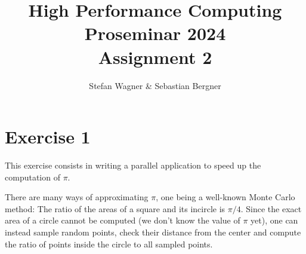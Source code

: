 \documentclass[UTF-8]{article}
\title{High Performance Computing Proseminar 2024 \\
    \large Assignment 2} %
\author{Stefan Wagner \& Sebastian Bergner}
\begin{document}
    
    \maketitle
    
    \section*{Exercise 1}
    This exercise consists in writing a parallel application to speed up the computation of $\pi$.
    
    There are many ways of approximating $\pi$, one being a well-known Monte Carlo method: The ratio of the areas of a square and its incircle is $\pi/4$. Since the exact area of a circle cannot be computed (we don't know the value of $\pi$ yet), one can instead sample random points, check their distance from the center and compute the ratio of points inside the circle to all sampled points.
    
\end{document}
